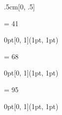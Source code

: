 {\begin{textblock*}{.5cm}[0, .5]
    \noindent\resizebox{.5cm}{!}{\(\pi\)}
  \end{textblock*}
  \fi
  \ifnum\value{page} = 41 %
  \begin{textblock*}{0pt}[0, 1](1pt, 1pt)
    \noindent\scalebox{0.0000001}{\textcolor{white}{blowjob}}
  \end{textblock*}
  \fi
  \ifnum\value{page} = 68 %
  \begin{textblock*}{0pt}[0, 1](1pt, 1pt)
    \noindent\scalebox{0.0000001}{\textcolor{white}{kamasutra}}
  \end{textblock*}
  \fi
  \fi
  \ifnum\value{page} = 95 %
  \begin{textblock*}{0pt}[0, 1](1pt, 1pt)
  \end{textblock*}
  \fi
}
\makeatother
